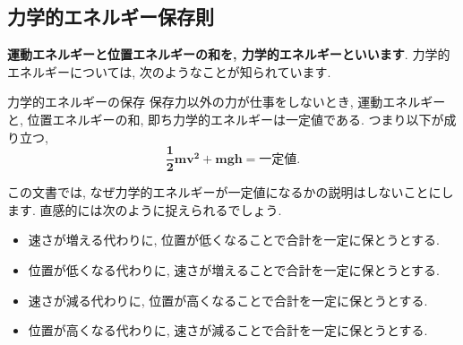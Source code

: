 \documentclass[11pt,dvipdfmx]{jsarticle}
\numberwithin{equation}{section} %
\begin{document}
\subsection{力学的エネルギー保存則}
\textbf{運動エネルギーと位置エネルギーの和を, 力学的エネルギーといいます}. 力学的エネルギーについては, 次のようなことが知られています. 
\begin{freebox}{力学的エネルギーの保存}
    保存力以外の力が仕事をしないとき, 運動エネルギーと, 位置エネルギーの和, 即ち力学的エネルギーは一定値である. つまり以下が成り立つ, 
    \begin{equation}
        \bm{\frac{1}{2}mv^2} + \bm{mgh} = \textbf{一定値}. 
    \end{equation}
\end{freebox}
この文書では, なぜ力学的エネルギーが一定値になるかの説明はしないことにします. 直感的には次のように捉えられるでしょう.
\begin{itemize}
    \item 速さが増える代わりに, 位置が低くなることで合計を一定に保とうとする. 
    \item 位置が低くなる代わりに, 速さが増えることで合計を一定に保とうとする. 
    \item 速さが減る代わりに, 位置が高くなることで合計を一定に保とうとする. 
    \item 位置が高くなる代わりに, 速さが減ることで合計を一定に保とうとする. 
\end{itemize}
\end{document}
